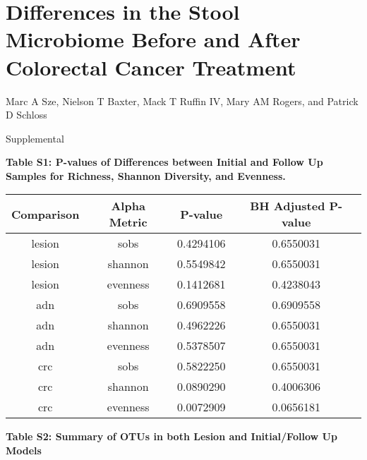 \documentclass[12pt,]{article}
\title{}
\author{}
\date{}
\begin{document}
\section{Differences in the Stool Microbiome Before and After Colorectal
Cancer
Treatment}\label{differences-in-the-stool-microbiome-before-and-after-colorectal-cancer-treatment}

\vspace{10mm}

\begin{center}
Marc A Sze, Nielson T Baxter, Mack T Ruffin IV, Mary AM Rogers, and Patrick D Schloss

\vspace{10mm}

Supplemental
\end{center}

\newpage

\textbf{Table S1: P-values of Differences between Initial and Follow Up
Samples for Richness, Shannon Diversity, and Evenness.}

\begin{longtable}[]{@{}cccc@{}}
\toprule
Comparison & Alpha Metric & P-value & BH Adjusted P-value\tabularnewline
\midrule
\endhead
lesion & sobs & 0.4294106 & 0.6550031\tabularnewline
lesion & shannon & 0.5549842 & 0.6550031\tabularnewline
lesion & evenness & 0.1412681 & 0.4238043\tabularnewline
adn & sobs & 0.6909558 & 0.6909558\tabularnewline
adn & shannon & 0.4962226 & 0.6550031\tabularnewline
adn & evenness & 0.5378507 & 0.6550031\tabularnewline
crc & sobs & 0.5822250 & 0.6550031\tabularnewline
crc & shannon & 0.0890290 & 0.4006306\tabularnewline
crc & evenness & 0.0072909 & 0.0656181\tabularnewline
\bottomrule
\end{longtable}

\newpage

\textbf{Table S2: Summary of OTUs in both Lesion and Initial/Follow Up
Models}
\end{document}
